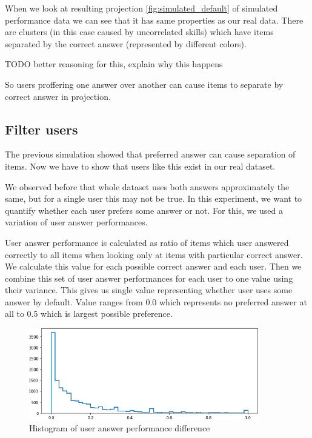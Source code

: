 \documentclass[
  digital, %
  table,   %
  nolof,     %
  nolot,     %
  nocover,
  color
]{fithesis3}
\begin{document}
When we look at resulting projection \ref{fig:simulated_default} of simulated performance data we can see that it has same properties as our real data. There are clusters (in this case caused by uncorrelated skills) which have items separated by the correct answer (represented by different colors).

TODO better reasoning for this, explain why this happens

So users proffering one answer over another can cause items to separate by correct answer in projection.


\subsection{Filter users}\label{filter-users}


The previous simulation showed that preferred answer can cause separation of items. Now we have to show that users like this exist in our real dataset.

We observed before that whole dataset uses both answers approximately the same, but for a single user this may not be true. In this experiment, we want to quantify whether each user prefers some answer or not. For this, we used a variation of user answer performances.

User answer performance is calculated as ratio of items which user answered correctly to all items when looking only at items with particular correct answer. We calculate this value for each possible correct answer and each user. Then we combine this set of user answer performances for each user to one value using their variance. This gives us single value representing whether user uses some answer by default. Value ranges from 0.0 which represents no preferred answer at all to 0.5 which is largest possible preference.

\begin{figure}
  \includegraphics[width=10cm]{img/uneven_answers_hist}
  \caption{Histogram of user answer performance difference}
  \label{fig:uneven_answers_hist}
\end{figure}
\end{document}
